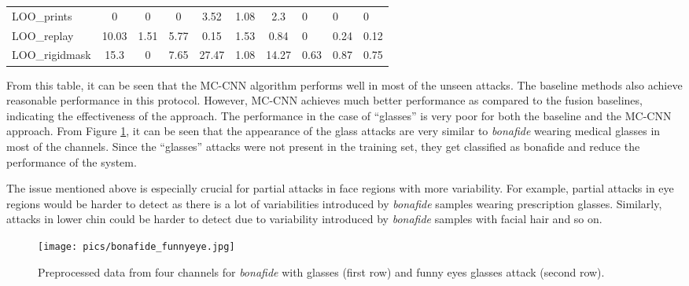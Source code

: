 \documentclass[journal]{IEEEtran}
\begin{document}
\begin{table*}[t]
\begin{tabular}{lccc|ccc|lll}
LOO\_prints                                   & 0                             & 0                            & 0                           & 3.52                        & 1.08                       & 2.3                       & 0         & 0       & 0       \\
LOO\_replay                                   & 10.03                         & 1.51                         & 5.77                        & 0.15                        & 1.53                       & 0.84                      & 0         & 0.24    & 0.12    \\
LOO\_rigidmask                                & 15.3                          & 0                            & 7.65                        & 27.47                       & 1.08                       & 14.27                     & 0.63      & 0.87    & 0.75    \\ \hline
\end{tabular}
\end{table*}


From this table, it can be seen that the MC-CNN algorithm performs well in most of the unseen attacks. The baseline methods also achieve reasonable performance in this protocol. However, MC-CNN achieves much better performance as compared to the fusion baselines, indicating the effectiveness of the approach. The performance in the case of ``glasses'' is very poor for both the baseline and the MC-CNN approach. From Figure \ref{fig:bonafide_funnyeyes}, it can be seen that the appearance of the glass attacks are very similar to \textit{bonafide} wearing medical glasses in most of the channels. Since the ``glasses'' attacks were not present in the training set, they get classified as bonafide and reduce the performance of the system.
 
The issue mentioned above is especially crucial for partial attacks in face regions with more variability. For example, partial attacks in eye regions would be harder to detect as there is a lot of variabilities introduced by \textit{bonafide} samples wearing prescription glasses. Similarly, attacks in lower chin could be harder to detect due to variability introduced by \textit{bonafide} samples with facial hair and so on.


\begin{figure}[t]
\centering
\texttt{[image: pics/bonafide\_funnyeye.jpg]}
\caption{Preprocessed data from four channels for \textit{bonafide} with glasses (first row) and funny eyes glasses attack (second row).}
\label{fig:bonafide_funnyeyes}
\end{figure}
\end{document}
